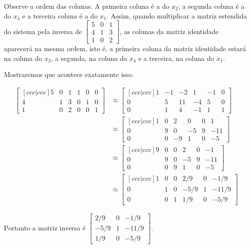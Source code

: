 Observe a ordem das colunas.
A primeira coluna é a do $ x_2 $; a segunda coluna é a do $ x_4 $ e a terceira
coluna é a do $ x_1 $.
Assim, quando multiplicar a matriz estendida do sistema pela inversa de 
$
  \begin{bmatrix}
   5 & 0 & 1 \\
   4 & 1 & 3 \\
   1 & 0 & 2
  \end{bmatrix}
$,
as colunas da matriz identidade aparecerá na mesma ordem, isto é, a primeira
coluna da matriz identidade estará na coluna do $ x_2 $, a segunda, na coluna do
$ x_4 $ e a terceira, na coluna do $ x_1 $.

Mostraremos que acontece exatamente isso.

\begin{align*}
  \begin{bmatrix}[ccc|ccc]
   5 & 0 & 1 & 1 & 0 & 0 \\
   4 & 1 & 3 & 0 & 1 & 0 \\
   1 & 0 & 2 & 0 & 0 & 1
  \end{bmatrix}
  &\approx
  \begin{bmatrix}[ccc|ccc]
   1 & -1 & -2 &  1 & -1 & 0 \\
   0 &  5 & 11 & -4 &  5 & 0 \\
   0 &  1 &  4 & -1 &  1 & 1 
  \end{bmatrix} \\
  &\approx
  \begin{bmatrix}[ccc|ccc]
   1 & 0 &  2 &  0 & 0 &   1 \\
   0 & 9 &  0 & -5 & 9 & -11 \\
   0 & 0 & -9 &  1 & 0 &  -5
  \end{bmatrix} \\
  &\approx 
  \begin{bmatrix}[ccc|ccc]
   9 & 0 & 0 &  2 & 0 &  -1 \\
   0 & 9 & 0 & -5 & 9 & -11 \\
   0 & 0 & 9 &  1 & 0 &  -5
  \end{bmatrix} \\
  &\approx 
  \begin{bmatrix}[ccc|ccc]
   1 & 0 & 0 &  2/9 & 0 &  -1/9 \\
   0 & 1 & 0 & -5/9 & 1 & -11/9 \\
   0 & 0 & 1 &  1/9 & 0 &  -5/9
  \end{bmatrix}
\end{align*}

Portanto a matriz inversa é 
$
  \begin{bmatrix}
    2/9 & 0 &  -1/9 \\
   -5/9 & 1 & -11/9 \\
    1/9 & 0 &  -5/9
  \end{bmatrix}
$.

